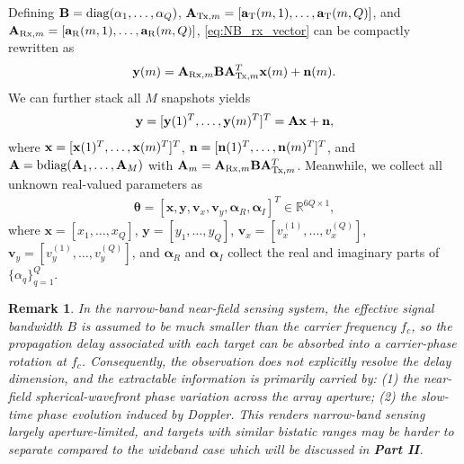 \documentclass[9pt,final,journal,twocolumn]{IEEEtran}
\newtheorem{remark}{Remark}
\begin{document}
Defining ${\bf B}=\mathrm{diag}(\alpha_1,\ldots,\alpha_Q)$, ${\bf A}_{\mathrm{Tx},m}=[{\bf a}_{\mathrm{T}}(m,1),\ldots,{\bf a}_{\mathrm{T}}(m,Q)]$, and ${\bf A}_{\mathrm{Rx},m}=[{\bf a}_{\mathrm{R}}(m,1),\ldots,{\bf a}_{\mathrm{R}}(m,Q)]$, \eqref{eq:NB_rx_vector} can be compactly rewritten as
\begin{align}\label{eq:NB_compact}
{\bf y}(m)
=
{\bf A}_{\mathrm{Rx},m}{\bf B}{\bf A}_{\mathrm{Tx},m}^{T}{\bf x}(m)
+{\bf n}(m).
\end{align}
We can further stack all $M$ snapshots yields
\begin{align}\label{eq:NB_stack}
{\bf y}=[{\bf y}(1)^T,\ldots,{\bf y}(m)^T]^T
=
{\bf A}{\bf x}+{\bf n},
\end{align}
where ${\bf x}=[{\bf x}(1)^T,\ldots,{\bf x}(m)^T]^T$, ${\bf n}=[{\bf n}(1)^T,\ldots,{\bf n}(m)^T]^T$, and ${\bf A}=\mathrm{bdiag}({\bf A}_1,\ldots,{\bf A}_M)$ with ${\bf A}_m={\bf A}_{\mathrm{Rx},m}{\bf B}{\bf A}_{\mathrm{Tx},m}^{T}$. %
Meanwhile, we collect all unknown real-valued parameters as
\begin{align}\label{eq:NB_param}
{\bm\theta}=[{\bm x},{\bm y},{\bm v}_x,{\bm v}_y,\bm\alpha_{R},\bm\alpha_{I}]^T\in \mathbb{R}^{6Q\times1},
\end{align}
where ${\bm x}=[x_1,\ldots,x_Q]$, ${\bm y}=[y_1,\ldots,y_Q]$, ${\bm v}_x=[v_x^{(1)},\ldots,v_x^{(Q)}]$, ${\bm v}_y=[v_y^{(1)},\ldots,v_y^{(Q)}]$, and $\bm\alpha_{R}$ and $\bm\alpha_{I}$ collect the real and imaginary parts of $\{\alpha_q\}_{q=1}^Q$.

\begin{remark}
In the narrow-band near-field sensing system, the effective signal bandwidth $B$ is assumed to be much smaller than the carrier frequency $f_c$, so the propagation delay associated with each target can be absorbed into a carrier-phase rotation at $f_c$. Consequently, the observation does not explicitly resolve the delay dimension, and the extractable information is primarily carried by: (1) the near-field spherical-wavefront phase variation across the array aperture; (2) the slow-time phase evolution induced by Doppler. This renders narrow-band sensing largely aperture-limited, and targets with similar bistatic ranges may be harder to separate compared to the wideband case which will be discussed in \textbf{Part II}.
\end{remark}
%
\end{document}
